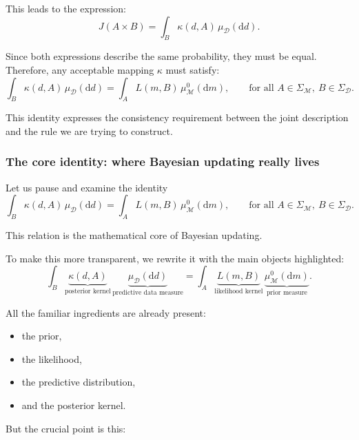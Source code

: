\documentclass[11pt]{article}
\theoremstyle{remark}
\newcommand{\modelspace}{\mathcal{M}}
\newcommand{\dataspace}{\mathcal{D}}
\begin{document}
This leads to the expression:
\[
J(A \times B)
=
\int_B \kappa(d,A)\,\mu_{\dataspace}(\mathrm dd).
\]

\vspace{2mm}

Since both expressions describe the same probability, they must be equal. Therefore, any acceptable mapping \(\kappa\) must satisfy:
\[
\int_B \kappa(d,A)\,\mu_{\dataspace}(\mathrm dd)
=
\int_A L(m,B)\,\mu_{\modelspace}^0(\mathrm dm),
\qquad
\text{for all } A \in \Sigma_{\modelspace},\ B \in \Sigma_{\dataspace}.
\]

\vspace{2mm}

This identity expresses the consistency requirement between the joint description and the rule we are trying to construct.


\subsubsection{The core identity: where Bayesian updating really lives}

Let us pause and examine the identity
\[
\int_B \kappa(d,A)\,\mu_{\dataspace}(\mathrm dd)
=
\int_A L(m,B)\,\mu_{\modelspace}^0(\mathrm dm),
\qquad
\text{for all } A \in \Sigma_{\modelspace},\ B \in \Sigma_{\dataspace}.
\]

\vspace{2mm}

This relation is the mathematical core of Bayesian updating.

To make this more transparent, we rewrite it with the main objects highlighted:
\[
\int_B
\underbrace{\kappa(d,A)}_{\text{posterior kernel}}
\,
\underbrace{\mu_{\dataspace}(\mathrm dd)}_{\text{predictive data measure}}
=
\int_A
\underbrace{L(m,B)}_{\text{likelihood kernel}}
\,
\underbrace{\mu_{\modelspace}^0(\mathrm dm)}_{\text{prior measure}}.
\]

\vspace{2mm}

All the familiar ingredients are already present:
\begin{itemize}
    \item the prior,
    \item the likelihood,
    \item the predictive distribution,
    \item and the posterior kernel.
\end{itemize}

But the crucial point is this:
\end{document}
